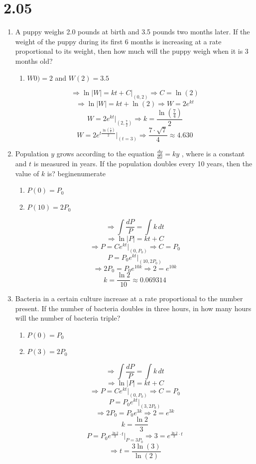 \documentclass[12pt]{article}
\begin{document}
\section*{2.05}
\begin{enumerate}
    \item A puppy weighs 2.0 pounds at birth and 3.5 pounds two months later. If the weight of the puppy during its first 6 months is increasing at a rate proportional to its weight, then how much will the puppy weigh when it is 3 months old?
    \begin{enumerate}
        \item $W0)=2$ and $W(2)=3.5$
    \end{enumerate}
    $$\Longrightarrow \ln|W|=kt+C \biggr\rvert_{(0,2)} \Longrightarrow C=\ln(2)$$
    $$\Longrightarrow \ln|W|=kt+\ln(2) \Longrightarrow W=2e^{kt}$$
    $$W=2e^{kt} \biggr\rvert_{(2,\frac{7}{2})} \Longrightarrow k=\frac{\ln(\frac{7}{4})}{2}$$
     $$\boxed{W=2e^{t\frac{\ln(\frac{7}{4})}{2}}\biggr\rvert_{(t=3)}\Longrightarrow \frac{7 \cdot \sqrt{7}}{4} \approx 4.630}$$
    
    \item Population $y$ grows according to the equation $\frac{dy}{dx}=ky$ , where is a constant and $t$ is measured in years. If the population doubles every 10 years, then the value of $k$ is?
    begin{enumerate}
\begin{enumerate}
    \item $P(0)=P_0$
    \item $P(10)=2P_0$
\end{enumerate}

$$\Longrightarrow \int \frac{dP}{P} = \int k \, dt$$
$$\Longrightarrow \ln|P|=kt +C$$
$$\Longrightarrow P=Ce^{kt}\biggr\rvert_{(0, P_0)} \Longrightarrow C=P_0$$
$$ P=P_0e^{kt} \biggr\rvert_{(10,2P_0)}$$
$$\Longrightarrow 2P_0=P_0e^{10k} \Longrightarrow 2=e^{10k} $$
$$\boxed{k=\frac{\ln 2}{10} \approx 0.069314}$$

    \item Bacteria in a certain culture increase at a rate proportional to the number present. If the number of bacteria doubles in three hours, in how many hours will the number of bacteria triple?
\begin{enumerate}
    \item $P(0)=P_0$
    \item $P(3)=2P_0$
\end{enumerate}

$$\Longrightarrow \int \frac{dP}{P} = \int k \, dt$$
$$\Longrightarrow \ln|P|=kt +C$$
$$\Longrightarrow P=Ce^{kt}\biggr\rvert_{(0, P_0)} \Longrightarrow C=P_0$$
$$ P=P_0e^{kt} \biggr\rvert_{(3,2P_0)}$$
$$\Longrightarrow 2P_0=P_0e^{3k} \Longrightarrow 2=e^{3k} $$
$$k=\frac{\ln 2}{3}$$
$$P=P_0e^{\frac{\ln 2}{3} \cdot t} \biggr\rvert_{P=3P_0} \Longrightarrow 3=e^{\frac{\ln 2}{3} \cdot t}$$
$$\boxed{\Longrightarrow t=\frac{3\ln(3)}{\ln(2)}}$$
    

\end{enumerate}
\end{document}

